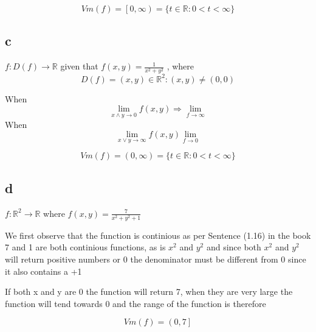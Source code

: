 \documentclass[12pt,a4paper]{article}
\newcommand{\R}{\mathbb{R}}
\begin{document}
\begin{equation} 
Vm(f)=\left[0,\infty\right)=\{t\in\R : 0 < t < \infty \} 
\end{equation}

\subsection{c}


\begin{math} 
f : D(f)\to\R  
\end{math}
given that
\begin{math} 
f(x,y)=\frac{1}{x^2+y^2}
\end{math}
,
where
\begin{equation} 
D(f)={(x,y) \in \R^2 : (x,y) \neq (0,0)}
\end{equation}

When
\begin{equation}
\lim_{x \land y \to 0} f(x,y) \Rightarrow \lim_{f\to\infty} 
\end{equation}
When 
 \begin{equation}
\lim_{x \lor y \to \infty} f(x,y) \lim_{f\to0} 
\end{equation}


\begin{equation} 
Vm(f)=\left(0,\infty\right) =\{t\in\R : 0 < t < \infty \} 
\end{equation}




\subsection{d}
\begin{center}
\begin{math}
f : \R ^2\to \R 
\end{math}
where
\begin{math} 
f(x,y)=\frac{7}{x^2+y^2+1}
\end{math}
\end{center}
\vspace{2 mm} 

We first observe that the function is continious as per Sentence (1.16) \cite{calcbeta1.16} in the book 7 and 1 are both continious functions, as is 
\begin{math}
x^2
\end{math}
and
\begin{math}
y^2
\end{math}
and since both 
\begin{math}
x^2
\end{math}
and
\begin{math}
y^2
\end{math}
will return positive numbers or 0 the denominator must be different from 0 since it also contains a +1

\vspace{2 mm} 
If both x and y are 0 the function will return 7, when they are very large the function will tend towards 0 and the range of the function is therefore

\begin{equation} 
Vm(f)=\left(0,7\right] 
\end{equation}



\printbibliography
\end{document}
